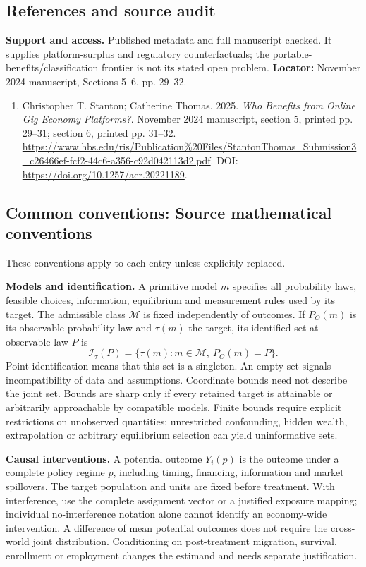 \documentclass[11pt,a4paper]{article}
\begin{document}
\subsection*{References and source audit}
\textbf{Support and access.} Published metadata and full manuscript checked. It supplies platform-surplus and regulatory counterfactuals; the portable-benefits/classification frontier is not its stated open problem. \textbf{Locator:} November 2024 manuscript, Sections 5--6, pp. 29--32.
\begin{enumerate}\raggedright
\item\hypertarget{definitions:source:30007639:1}{} Christopher T. Stanton; Catherine Thomas. 2025. \emph{Who Benefits from Online Gig Economy Platforms?}. November 2024 manuscript, section 5, printed pp. 29–31; section 6, printed pp. 31–32.
\url{https://www.hbs.edu/ris/Publication%20Files/StantonThomas_Submission3_c26466ef-fcf2-44c6-a356-c92d042113d2.pdf}.
DOI: \url{https://doi.org/10.1257/aer.20221189}.
\end{enumerate}

\subsection*{Common conventions: Source mathematical conventions}

These conventions apply to each entry unless explicitly replaced.

\textbf{Models and identification.} A primitive model \(m\) specifies all probability laws, feasible choices, information, equilibrium and measurement rules used by its target. The admissible class \(\mathcal M\) is fixed independently of outcomes. If \(P_O(m)\) is its observable probability law and \(\tau(m)\) the target, its identified set at observable law \(P\) is
\[
 \mathcal I_\tau(P)=\{\tau(m):m\in\mathcal M,\ P_O(m)=P\}.
\]
Point identification means that this set is a singleton. An empty set signals incompatibility of data and assumptions. Coordinate bounds need not describe the joint set. Bounds are sharp only if every retained target is attainable or arbitrarily approachable by compatible models. Finite bounds require explicit restrictions on unobserved quantities; unrestricted confounding, hidden wealth, extrapolation or arbitrary equilibrium selection can yield uninformative sets.

\textbf{Causal interventions.} A potential outcome \(Y_i(p)\) is the outcome under a complete policy regime \(p\), including timing, financing, information and market spillovers. The target population and units are fixed before treatment. With interference, use the complete assignment vector or a justified exposure mapping; individual no-interference notation alone cannot identify an economy-wide intervention. A difference of mean potential outcomes does not require the cross-world joint distribution. Conditioning on post-treatment migration, survival, enrollment or employment changes the estimand and needs separate justification.
\end{document}
